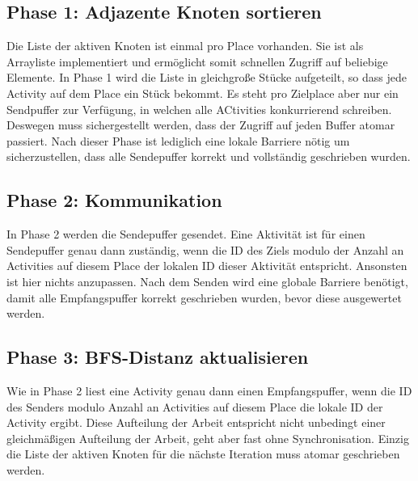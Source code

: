 \subsection{Phase 1: Adjazente Knoten sortieren} %
\label{sub:phase_1_invasive}
Die Liste der aktiven Knoten ist einmal pro Place vorhanden. Sie ist als Arrayliste implementiert und ermöglicht somit schnellen Zugriff auf beliebige Elemente. In Phase 1 wird die Liste in gleichgroße Stücke aufgeteilt, so dass jede Activity auf dem Place ein Stück bekommt. Es steht pro Zielplace aber nur ein Sendpuffer zur Verfügung, in welchen alle ACtivities konkurrierend schreiben. Deswegen muss sichergestellt werden, dass der Zugriff auf jeden Buffer atomar passiert. Nach dieser Phase ist lediglich eine lokale Barriere nötig um sicherzustellen, dass alle Sendepuffer korrekt und vollständig geschrieben wurden. 

\subsection{Phase 2: Kommunikation} %
\label{sub:parallel_phase_2_invasive}
In Phase 2 werden die Sendepuffer gesendet. Eine Aktivität ist für einen Sendepuffer genau dann zuständig, wenn die ID des Ziels modulo der Anzahl an Activities auf diesem Place der lokalen ID dieser Aktivität entspricht. Ansonsten ist hier nichts anzupassen. Nach dem Senden wird eine globale Barriere benötigt, damit alle Empfangspuffer korrekt geschrieben wurden, bevor diese ausgewertet werden.

\subsection{Phase 3: BFS-Distanz aktualisieren} %
\label{sub:phase_3_invasive}
Wie in Phase 2 liest eine Activity genau dann einen Empfangspuffer, wenn die ID des Senders modulo Anzahl an Activities auf diesem Place die lokale ID der Activity ergibt. Diese Aufteilung der Arbeit entspricht nicht unbedingt einer gleichmäßigen Aufteilung der Arbeit, geht aber fast ohne Synchronisation. Einzig die Liste der aktiven Knoten für die nächste Iteration muss atomar geschrieben werden.

